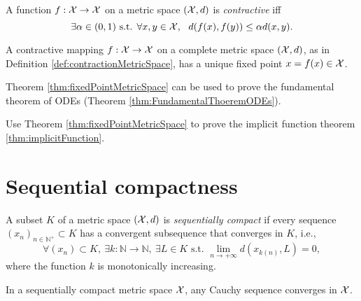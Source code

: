\begin{defn}
  \label{def:contractionMetricSpace}
  A function $f:{\cal X}\rightarrow {\cal X}$
  on a metric space $({\cal X},d)$
  is \emph{contractive} iff
  \begin{equation}
    \label{eq:contractionMetricSpace}
    \exists \alpha\in(0,1) \text{ s.t. }
    \forall x,y\in {\cal X}, \ \ 
    d(f(x),f(y)) \le \alpha d(x,y).
  \end{equation}
\end{defn}


\begin{thm}
  \label{thm:fixedPointMetricSpace}
  A contractive mapping $f:{\cal X}\rightarrow {\cal X}$
  on a complete metric space $({\cal X},d)$, 
  as in Definition \ref{def:contractionMetricSpace}, 
  has a unique fixed point $x=f(x)\in {\cal X}$.
\end{thm}


\begin{exm}
  Theorem \ref{thm:fixedPointMetricSpace}
  can be used to prove the fundamental theorem of ODEs
  (Theorem \ref{thm:FundamentalThoeremODEs}). 
\end{exm}


\begin{exc}
  Use Theorem \ref{thm:fixedPointMetricSpace}
  to prove the implicit function theorem
  \ref{thm:implicitFunction}. 
\end{exc}


\section{Sequential compactness}
\label{sec:sequentialCompactness}


\begin{defn}
  \label{def:sequentialCompactness}
  A subset $K$ of a metric space $({\cal X},d)$
  is \emph{sequentially compact}
  if every sequence $(x_n)_{n\in \mathbb{N}^+}\subset K$ has
  a convergent subsequence that converges in $K$, i.e., 
  \begin{equation}
    \label{eq:sequentialCompactness}
    \forall (x_n)\subset K,\
    \exists k: \mathbb{N}\rightarrow \mathbb{N},\ \exists L\in K
    \text{ s.t. }
    \lim_{n\rightarrow +\infty} d(x_{k(n)}, L)=0, 
  \end{equation}
  where the function $k$ is monotonically increasing. 
\end{defn}


\begin{lem}
  \label{lem:CauchySeqInCompactMetric}
  In a sequentially compact metric space ${\cal X}$,   
  any Cauchy sequence converges in ${\cal X}$.
\end{lem}


